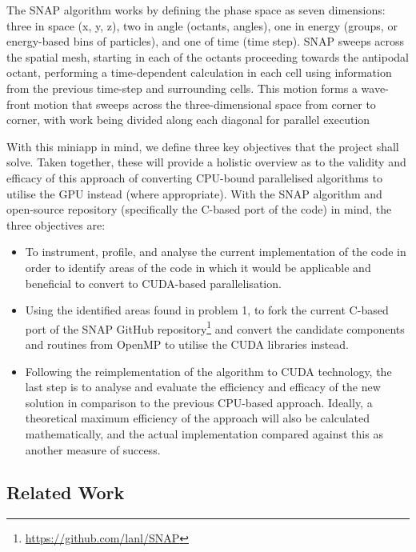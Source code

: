 \documentclass[conference]{IEEEtran}
\begin{document}
The SNAP algorithm works by defining the phase space as seven dimensions: three in space (x, y, z), two in angle (octants, angles), one in energy (groups, or energy-based bins of particles), and one of time (time step). SNAP sweeps across the spatial mesh, starting in each of the octants proceeding towards the antipodal octant, performing a time-dependent calculation in each cell using information from the previous time-step and surrounding cells. This motion forms a wave-front motion that sweeps across the three-dimensional space from corner to corner, with work being divided along each diagonal for parallel execution

With this miniapp in mind, we define three key objectives that the project shall solve. Taken together, these will provide a holistic overview as to the validity and efficacy of this approach of converting CPU-bound parallelised algorithms to utilise the GPU instead (where appropriate). With the SNAP algorithm and open-source repository (specifically the C-based port of the code) in mind, the three objectives are:

\begin{itemize}

\item To instrument, profile, and analyse the current implementation of the code in order to identify areas of the code in which it would be applicable and beneficial to convert to CUDA-based parallelisation.

\item Using the identified areas found in problem 1, to fork the current C-based port of the SNAP GitHub repository\footnote{\url{https://github.com/lanl/SNAP}} and convert the candidate components and routines from OpenMP to utilise the CUDA libraries instead.

\item Following the reimplementation of the algorithm to CUDA technology, the last step is to analyse and evaluate the efficiency and efficacy of the new solution in comparison to the previous CPU-based approach. Ideally, a theoretical maximum efficiency of the approach will also be calculated mathematically, and the actual implementation compared against this as another measure of success.

\end{itemize}


\subsection{Related Work}
\end{document}
